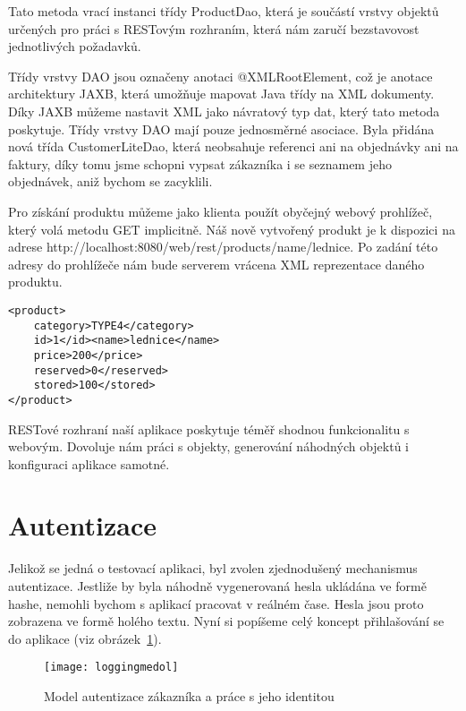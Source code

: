 \documentclass[122pt,oneside]{fithesis}
\begin{document}
Tato metoda vrací instanci třídy ProductDao, která je součástí vrstvy objektů určených pro práci s RESTovým rozhraním, která nám zaručí bezstavovost jednotlivých požadavků. 

Třídy vrstvy DAO jsou označeny anotaci @XMLRootElement, což je anotace architektury JAXB, která umožňuje mapovat Java třídy na XML dokumenty. Díky JAXB můžeme nastavit XML jako návratový typ dat, který tato metoda poskytuje. Třídy vrstvy DAO mají pouze jednosměrné asociace. Byla přidána nová třída CustomerLiteDao, která neobsahuje referenci ani na objednávky ani na faktury, díky tomu jsme schopni vypsat zákazníka i se seznamem jeho objednávek, aniž bychom se zacyklili.

Pro získání produktu můžeme jako klienta použít obyčejný webový prohlížeč, který volá metodu GET implicitně. Náš nově vytvořený produkt je k dispozici na adrese http://localhost:8080/web/rest/products/name/lednice.
Po zadání této adresy do prohlížeče nám bude serverem vrácena XML reprezentace daného produktu.

\begin{lstlisting}
<product>
	category>TYPE4</category>
	id>1</id><name>lednice</name>
	price>200</price>
	reserved>0</reserved>
	stored>100</stored>
</product>
\end{lstlisting}

RESTové rozhraní naší aplikace poskytuje téměř shodnou funkcionalitu s webovým. Dovoluje nám práci s objekty, generování náhodných objektů i konfiguraci aplikace samotné.

\section{Autentizace}
Jelikož se jedná o testovací aplikaci, byl zvolen zjednodušený mechanismus autentizace. Jestliže by byla náhodně vygenerovaná hesla ukládána ve formě hashe, nemohli bychom s aplikací pracovat v reálném čase. Hesla jsou proto zobrazena ve formě holého textu. Nyní si popíšeme celý koncept přihlašování se do aplikace (viz obrázek~\ref{img:identity}).

\begin{figure}[!ht]
\centering
\texttt{[image: loggingmedol]}
\caption{Model autentizace zákazníka a práce s jeho identitou}
\label{img:identity}
\end{figure}
\end{document}
